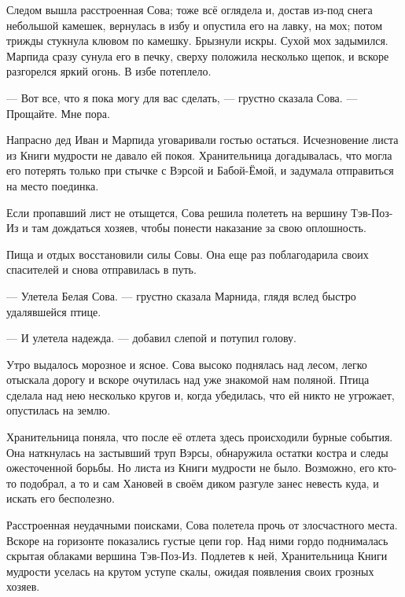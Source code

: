\documentclass[oneside,final,14pt]{extreport}
\begin{document}
	Следом вышла расстроенная Сова; тоже всё оглядела и, достав из-под снега небольшой камешек, вернулась в избу и опустила его на лавку, на мох; потом трижды стукнула клювом по камешку. Брызнули искры. Сухой мох задымился. Марпида сразу сунула его в печку, сверху положила несколько щепок, и вскоре разгорелся яркий огонь. В избе потеплело.
	
	— Вот все, что я пока могу для вас сделать, — грустно сказала Сова. — Прощайте. Мне пора.
	
	Напрасно дед Иван и Марпида уговаривали гостью остаться. Исчезновение листа из Книги мудрости не давало ей покоя. Хранительница догадывалась, что могла его потерять только при стычке с Вэрсой и Бабой-Ёмой, и задумала отправиться на место поединка.
	
	Если пропавший лист не отыщется, Сова решила полететь на вершину Тэв-Поз-Из и там дождаться хозяев, чтобы понести наказание за свою оплошность.
	
	Пища и отдых восстановили силы Совы. Она еще раз поблагодарила своих спасителей и снова отправилась в путь.
	
	— Улетела Белая Сова. — грустно сказала Марнида, глядя вслед быстро удалявшейся птице.
	
	— И улетела надежда. — добавил слепой и потупил голову.
	
	Утро выдалось морозное и ясное. Сова высоко поднялась над лесом, легко отыскала дорогу и вскоре очутилась над уже знакомой нам поляной. Птица сделала над нею несколько кругов и, когда убедилась, что ей никто не угрожает, опустилась на землю.
	
	Хранительница поняла, что после её отлета здесь происходили бурные события. Она наткнулась на застывший труп Вэрсы, обнаружила остатки костра и следы ожесточенной борьбы. Но листа из Книги мудрости не было. Возможно, его кто-то подобрал, а то и сам Хановей в своём диком разгуле занес невесть куда, и искать его бесполезно.
	
	Расстроенная неудачными поисками, Сова полетела прочь от злосчастного места. Вскоре на горизонте показались густые цепи гор. Над ними гордо поднималась скрытая облаками вершина Тэв-Поз-Из. Подлетев к ней, Хранительница Книги мудрости уселась на крутом уступе скалы, ожидая появления своих грозных хозяев.
	
	
\end{document}
